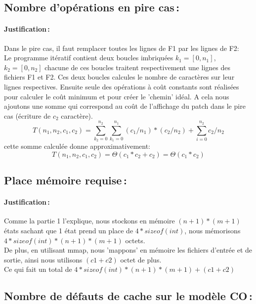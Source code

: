\documentclass[a4paper, 10pt, french]{article}
\begin{document}
  \subsection{Nombre  d'opérations en pire cas\,: }
    \paragraph{Justification\,: }
    {Dans le pire cas, il faut remplacer toutes les lignes de F1 par les lignes de F2: 
      \\Le programme itératif contient deux boucles imbriquées $k_1=[0,n_1]$, $k_2=[0,n_2]$ chacune de ces boucles traitent respectivement une lignes des fichiers F1 et F2. Ces deux boucles calcules le nombre de caractères sur leur lignes respectives. Ensuite seule des opérations à coût constants sont réalisées pour calculer le coût minimum et pour créer le 'chemin' idéal. A cela nous ajoutons une somme qui correspond au coût de l'affichage du patch dans le pire cas (écriture de $c_2$ caractère).
      $$T(n_1, n_2, c_1, c_2) = \sum_{k_2=0}^{n_2}  \sum_{k_1=0}^{n_1} (c_1/n_1)*(c_2/n_2) + \sum_{i=0}^{n_2} c_2/n_2 $$ 
      cette somme calculée donne approximativement: $$ T(n_1, n_2, c_1, c_2) = \Theta (c_1*c_2+c_2) = \Theta (c_1*c_2) $$ 
    } 
  \subsection{Place mémoire requise\,: }
    \paragraph{Justification\,: }
    {
    	Comme la partie 1 l'explique, nous stockons en mémoire $(n+1)*(m+1)$ états sachant que 1 état prend un place de $4*sizeof(int)$, nous mémorisons $4*sizeof(int)*(n+1)*(m+1)$ octets.
	\\De plus, en utilisant mmap, nous 'mappons' en mémoire les fichiers d'entrée et de sortie, ainsi nous utilisons $(c1+c2)$ octet de plus. \\Ce qui fait un total de $4*sizeof(int)*(n+1)*(m+1) + (c1+c2)$
    }

  \subsection{Nombre de défauts de cache sur le modèle CO\,: }
\end{document}
